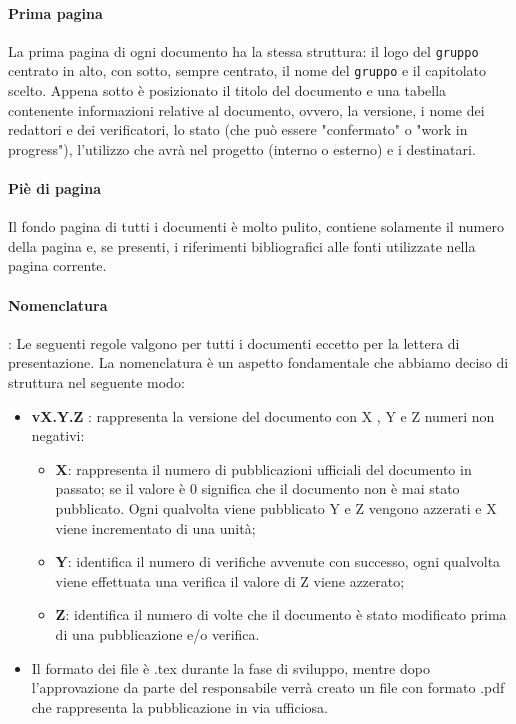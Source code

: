 \paragraph{Prima pagina}
La prima pagina di ogni documento ha la stessa struttura: il logo del \texttt{gruppo} centrato in alto, con sotto, sempre centrato, il nome del \texttt{gruppo} e il capitolato scelto. Appena sotto è posizionato il titolo del documento e una tabella contenente informazioni relative al documento, ovvero, la versione, i nome dei redattori e dei verificatori, lo stato (che può essere "confermato" o "work in progress"), l'utilizzo che avrà nel progetto (interno o esterno) e i destinatari.

\paragraph{Piè di pagina}
Il fondo pagina di tutti i documenti è molto pulito, contiene solamente il numero della pagina e, se presenti, i riferimenti bibliografici alle fonti utilizzate nella pagina corrente.

\paragraph{Nomenclatura}:
Le seguenti regole valgono per tutti i documenti eccetto per la lettera di presentazione. La nomenclatura è un aspetto fondamentale che abbiamo deciso di struttura nel seguente modo: 
\begin{itemize}
	\item \textbf{vX.Y.Z }: rappresenta la versione del documento con X , Y e Z numeri non negativi:
	\begin{itemize}
		\item \textbf{X}: rappresenta il numero di pubblicazioni ufficiali del documento in passato; se il valore è 0 significa che il documento non è mai stato pubblicato. Ogni qualvolta viene pubblicato Y e Z vengono azzerati e X viene incrementato di una unità;
		\item \textbf{Y}: identifica il numero di verifiche avvenute con successo, ogni qualvolta viene effettuata una verifica il valore di Z viene azzerato;
		\item \textbf{Z}: identifica il numero di volte che il documento è stato modificato prima di una pubblicazione e/o verifica.
	\end{itemize}
	\item Il formato dei file è .tex durante la fase di sviluppo, mentre dopo l'approvazione da parte del responsabile verrà creato un file con formato .pdf che rappresenta la pubblicazione in via ufficiosa.
\end{itemize}

